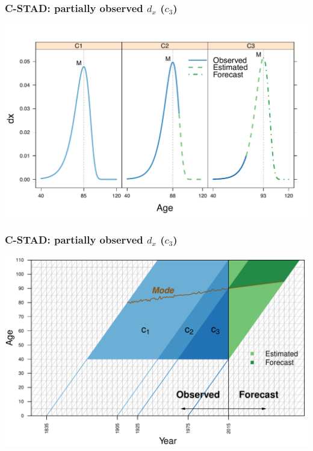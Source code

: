 \documentclass[12pt, xcolor=table]{beamer}  %
\begin{document}
\begin{frame}\frametitle{C-STAD: partially observed $d_x$ ($c_3$)}
	
	\vspace{0.1cm}
	\begin{center}
		\includegraphics[scale=0.56]{Figures/Ch4/F4_c3}
	\end{center}
	
\end{frame}

\begin{frame}[noframenumbering]\frametitle{C-STAD: partially observed $d_x$ ($c_3$)}
	
	\vspace{0.4cm}
	\begin{center}
		\includegraphics[scale=0.56]{Figures/Ch4/F5_CSTAD_3}
	\end{center}
	
\end{frame}
\end{document}
